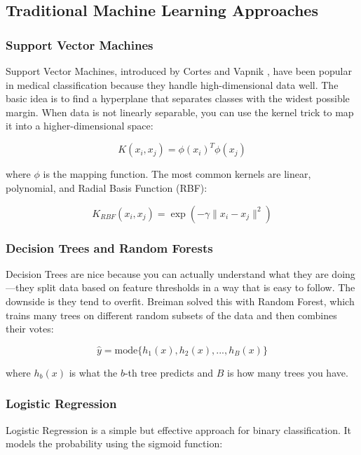 \documentclass[12pt]{article}
\begin{document}
\subsection{Traditional Machine Learning Approaches}

\subsubsection{Support Vector Machines}
Support Vector Machines, introduced by Cortes and Vapnik \cite{cortes1995}, have been popular in medical classification because they handle high-dimensional data well. The basic idea is to find a hyperplane that separates classes with the widest possible margin. When data is not linearly separable, you can use the kernel trick to map it into a higher-dimensional space:

\begin{equation}
K(x_i, x_j) = \phi(x_i)^T \phi(x_j)
\end{equation}

where $\phi$ is the mapping function. The most common kernels are linear, polynomial, and Radial Basis Function (RBF):

\begin{equation}
K_{RBF}(x_i, x_j) = \exp\left(-\gamma \|x_i - x_j\|^2\right)
\end{equation}

\subsubsection{Decision Trees and Random Forests}
Decision Trees are nice because you can actually understand what they are doing---they split data based on feature thresholds in a way that is easy to follow. The downside is they tend to overfit. Breiman \cite{breiman2001} solved this with Random Forest, which trains many trees on different random subsets of the data and then combines their votes:

\begin{equation}
\hat{y} = \text{mode}\{h_1(x), h_2(x), ..., h_B(x)\}
\end{equation}

where $h_b(x)$ is what the $b$-th tree predicts and $B$ is how many trees you have.

\subsubsection{Logistic Regression}
Logistic Regression is a simple but effective approach for binary classification. It models the probability using the sigmoid function:
\end{document}
